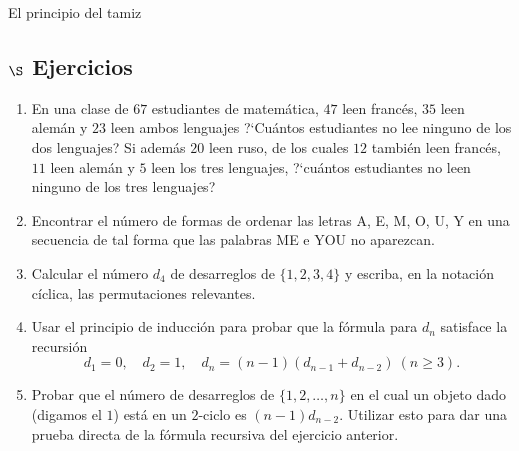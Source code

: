 \begin{section}{El principio del tamiz}
%
	
\subsection*{\Large $\S$ Ejercicios}
\begin{enumerate}
\item En una clase de $67$ estudiantes de matemática, $47$ leen francés, $35$ leen alemán y $23$ leen ambos lenguajes ?`Cuántos estudiantes no lee
ninguno de los dos lenguajes? Si además $20$ leen ruso, de los
cuales $12$ también leen francés, $11$ leen alemán y $5$ leen los tres
lenguajes, ?`cuántos estudiantes no leen ninguno de los tres
lenguajes?

\item Encontrar el número de formas de ordenar las letras A, E, M, O, U, Y en
una secuencia de tal forma que las palabras ME e YOU no aparezcan.

\item
Calcular el número $d_4$ de desarreglos de $\{1,2,3,4\}$ y escriba,
en la notación cíclica, las permutaciones relevantes.

\item Usar el principio de inducción para probar que la fórmula para
$d_n$ satisface la recursión
$$
d_1=0, \quad d_2=1,\quad d_n= (n-1)(d_{n-1}+d_{n-2}) \ (n\ge 3).
$$

\item Probar que el número de desarreglos de $\{1,2,\ldots,n\}$ en el
cual un objeto dado (digamos el $1$) está en un $2$-ciclo es
$(n-1)d_{n-2}$. Utilizar esto para dar una prueba directa de la
fórmula recursiva del ejercicio anterior.
\end{enumerate}

\end{section}


